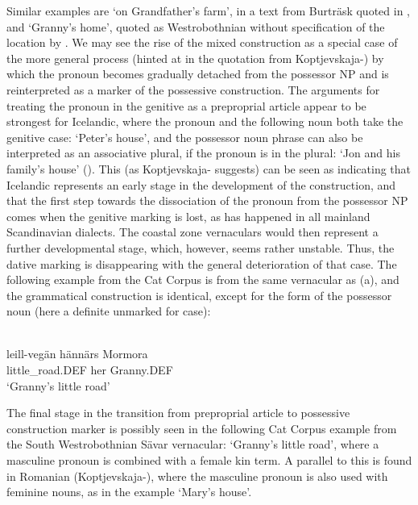 Similar examples are  ‘on Grandfather’s farm’, in a text from Burträsk quoted in \citet[104]{Wessén1966}, and  ‘Granny’s home’, quoted as Westrobothnian without specification of the location by \citet[131]{Larsson1929}. We may see the rise of the mixed construction as a special case of the more general process (hinted at in the quotation from Koptjevskaja-\citet{Tamm2003}) by which the pronoun becomes gradually detached from the possessor NP and is reinterpreted as a marker of the possessive construction. The arguments for treating the pronoun in the genitive as a preproprial article appear to be strongest for Icelandic, where the pronoun and the following noun both take the genitive case: ‘Peter’s house’, and the possessor noun phrase can also be interpreted as an associative plural, if the pronoun is in the plural:  ‘Jon and his family’s house’ (\citet[69]{Delsing2003b}). This (as Koptjevskaja-\citet[632]{Tamm2003} suggests) can be seen as indicating that Icelandic represents an early stage in the development of the construction, and that the first step towards the dissociation of the pronoun from the possessor NP comes when the genitive marking is lost, as has happened in all mainland Scandinavian dialects. The coastal zone vernaculars would then represent a further developmental stage, which, however, seems rather unstable. Thus, the dative marking is disappearing with the general deterioration of that case. The following example from the Cat Corpus is from the same vernacular as (a), and the grammatical construction is identical, except for the form of the possessor noun (here a definite unmarked for case): 

\ea\label{}
\\
\gll leill-vegän  hännärs  Mormora\\
little\_road.DEF  her  Granny.DEF\\
\glt ‘Granny’s little road’
\z

 The final stage in the transition from preproprial article to possessive construction marker is possibly seen in the following Cat Corpus example from the South Westrobothnian Sävar vernacular: ‘Granny’s little road’, where a masculine pronoun is combined with a female kin term. A parallel to this is found in Romanian (Koptjevskaja-\citet[632]{Tamm2003}), where the masculine pronoun  is also used with feminine nouns, as in the example  ‘Mary’s house’.

